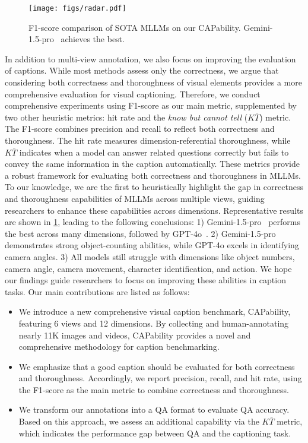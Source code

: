 \begin{figure}[t]
\centering
\texttt{[image: figs/radar.pdf]}
\caption{F1-score comparison of SOTA MLLMs on our CAPability. Gemini-1.5-pro~\cite{gemini1.5} achieves the best.}
\label{fig:radar}
\end{figure}

In addition to multi-view annotation, we also focus on improving the evaluation of captions. While most methods assess only the correctness, we argue that considering both correctness and thoroughness of visual elements provides a more comprehensive evaluation for visual captioning.
Therefore, we conduct comprehensive experiments using F1-score as our main metric, supplemented by two other heuristic metrics: hit rate and the \textit{know but cannot tell} ($K\bar{T}$) metric. The F1-score combines precision and recall to reflect both correctness and thoroughness. The hit rate measures dimension-referential thoroughness, while $K\bar{T}$ indicates when a model can answer related questions correctly but fails to convey the same information in the caption automatically. These metrics provide a robust framework for evaluating both correctness and thoroughness in MLLMs.
To our knowledge, we are the first to heuristically highlight the gap in correctness and thoroughness capabilities of MLLMs across multiple views, guiding researchers to enhance these capabilities across dimensions.
Representative results are shown in \cref{fig:radar}, leading to the following conclusions: 1) Gemini-1.5-pro~\cite{gemini1.5} performs the best across many dimensions, followed by GPT-4o~\cite{gpt4o}. 2) Gemini-1.5-pro demonstrates strong object-counting abilities, while GPT-4o excels in identifying camera angles. 3) All models still struggle with dimensions like object numbers, camera angle, camera movement, character identification, and action. We hope our findings guide researchers to focus on improving these abilities in caption tasks.
Our main contributions are listed as follows:
\begin{itemize}
    \item We introduce a new comprehensive visual caption benchmark, CAPability, featuring 6 views and 12 dimensions. By collecting and human-annotating nearly 11K images and videos, CAPability provides a novel and comprehensive methodology for caption benchmarking.
    \item We emphasize that a good caption should be evaluated for both correctness and thoroughness. Accordingly, we report precision, recall, and hit rate, using the F1-score as the main metric to combine correctness and thoroughness.
    \item We transform our annotations into a QA format to evaluate QA accuracy. Based on this approach, we assess an additional capability via the $K\bar{T}$ metric, which indicates the performance gap between QA and the captioning task.
\end{itemize}


